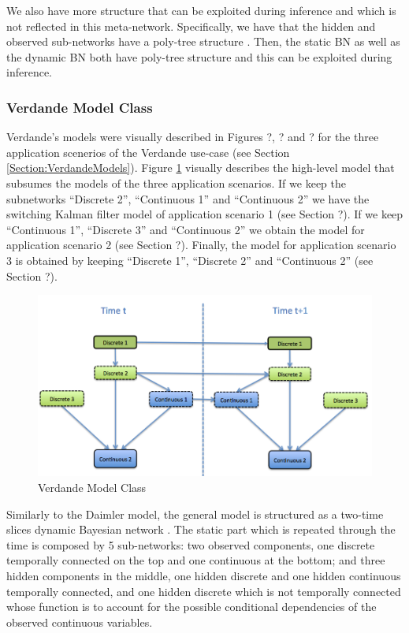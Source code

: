 We also have more structure that can be exploited during inference and which is not reflected in this meta-network. Specifically, we have that the hidden and observed sub-networks have a poly-tree structure \cite{JensenNielsen2007}. Then, the static BN as well as the dynamic BN both have poly-tree structure and this can be exploited during inference. 



\subsubsection*{Verdande Model Class}

Verdande's models were visually described in Figures ?, ? and ? for the three application scenerios of the Verdande use-case (see Section \ref{Section:VerdandeModels}).
Figure \ref{Figure:VerdandeModelClass} visually describes the high-level model that subsumes the models
of the three application scenarios. If we keep the subnetworks ``Discrete 2'', ``Continuous 1'' and ``Continuous 2'' we have the switching Kalman filter model of application scenario 1 (see Section ?). If we keep ``Continuous 1'', ``Discrete 3'' and ``Continuous 2'' we obtain the model for application scenario 2 (see Section ?). Finally, the model for application scenario 3 is obtained by keeping ``Discrete 1'', ``Discrete 2'' and ``Continuous 2'' (see Section ?).  

\begin{figure}
\begin{center}
\includegraphics[scale=0.4]{./figures/VerdandeModelClass}
\caption{\label{Figure:VerdandeModelClass} Verdande Model Class}
\end{center}
\end{figure}

Similarly to the Daimler model, the general model is structured as a two-time slices dynamic Bayesian network \cite{JensenNielsen2007}. The static part which is repeated through the time is composed by 5 sub-networks: two observed components, one discrete temporally connected on the top and one continuous at the bottom; and three hidden components in the middle, one hidden discrete and one hidden continuous temporally connected, and one hidden discrete which is not temporally connected whose function is to account for the possible conditional dependencies of the observed continuous variables.  

